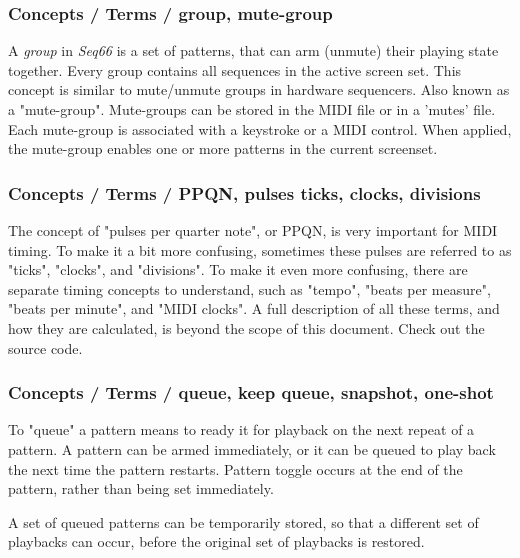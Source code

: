 \subsubsection{Concepts / Terms / group, mute-group}
\label{subsubsec:concepts_terms_group}

   A \textsl{group} in \textsl{Seq66} is a
   set of patterns, that can arm (unmute) their playing state
   together.
   Every group contains all sequences in the active screen set. 
   This concept is similar to mute/unmute groups in hardware
   sequencers.
   Also known as a "mute-group".
   Mute-groups can be stored in the MIDI file or in a 'mutes' file.
   Each mute-group is associated with a keystroke or a MIDI control.
   When applied, the mute-group enables one or more patterns in the current
   screenset.

\subsubsection{Concepts / Terms / PPQN, pulses ticks, clocks, divisions}
\label{subsubsec:concepts_terms_pulses}

   The concept of "pulses per quarter note", or PPQN, is very important for
   MIDI timing.  To make it a bit more confusing, sometimes these pulses are
   referred to as "ticks", "clocks", and "divisions".
   To make it even more confusing, there are separate timing concepts to
   understand, such as "tempo", "beats per measure", "beats per minute", and
   "MIDI clocks".
   A full description of all these terms, and how they are calculated, is
   beyond the scope of this document.  Check out the source code.

\subsubsection{Concepts / Terms / queue, keep queue, snapshot, one-shot}
\label{subsubsec:concepts_terms_queue_mode}

   To "queue" a pattern means to ready it for playback on the next repeat of
   a pattern.  A pattern can be armed immediately, or it can be queued to
   play back the next time the pattern restarts.
   Pattern toggle occurs at the end of the pattern,
   rather than being set immediately.

   A set of queued patterns can be temporarily stored, so that a different
   set of playbacks can occur, before the original set of playbacks is
   restored.

